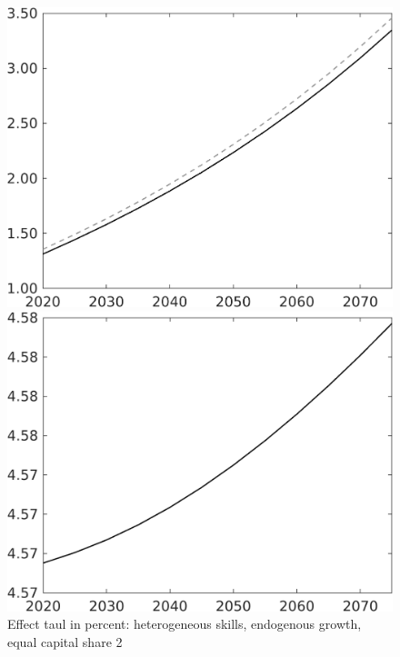 \documentclass[12pt]{article}
\begin{document}
\begin{figure}[h!!]
	\centering
	\caption{Effect taul in percent: heterogeneous skills, endogenous growth, equal capital share 2}\label{fig:LF_BAU_nsk0_xgr0_equalcapShare2}
	
	\begin{minipage}[]{0.32\textwidth}
		\includegraphics[width=1\textwidth]{../../codding_model/own_basedOnFried/optimalPol_010922_revision/figures/all_13Sept22/CompTaul_Equlab_LFBAU_Reg0_wl_spillover0_nsk0_xgr0_knspil0_sep1_countec0_GovRev0_etaa0.79_lgd0.png}
	\end{minipage}	
	\begin{minipage}[]{0.32\textwidth}
		\includegraphics[width=1\textwidth]{../../codding_model/own_basedOnFried/optimalPol_010922_revision/figures/all_13Sept22/CompTaul_Equlab_LFBAUPer_Reg0_wh_spillover0_nsk0_xgr0_knspil0_sep1_countec0_GovRev0_etaa0.79.png}

\end{minipage}
\end{figure}
\end{document}
